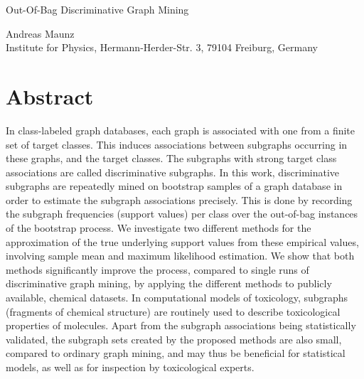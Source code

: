 \documentclass{article}
\begin{document}

%

\begin{center}
\begin{huge}Out-Of-Bag Discriminative Graph Mining\end{huge}

Andreas Maunz \\Institute for Physics, Hermann-Herder-Str. 3, 79104 Freiburg, Germany
\end{center}

\section{Abstract}

In class-labeled graph databases, each graph is associated with one from a
finite set of target classes.  This induces associations between subgraphs
occurring in these graphs, and the target classes. The subgraphs with strong
target class associations are called discriminative subgraphs.  In this work,
discriminative subgraphs are repeatedly mined on bootstrap samples of a graph
database in order to estimate the subgraph associations precisely.  This is
done by recording the subgraph frequencies (support values) per class over the
out-of-bag instances of the bootstrap process.  We investigate two different
methods for the approximation of the true underlying support values from these
empirical values, involving sample mean and maximum likelihood estimation.  We
show that both methods significantly improve the process, compared to single
runs of discriminative graph mining, by applying the different methods to
publicly available, chemical datasets.  In computational models of toxicology,
subgraphs (fragments of chemical structure) are routinely used to describe
toxicological properties of molecules. Apart from the subgraph associations being
statistically validated, the subgraph sets created by the proposed methods are
also small, compared to ordinary graph mining, and may thus be beneficial
for statistical models, as well as for inspection by toxicological experts.
\end{document}
